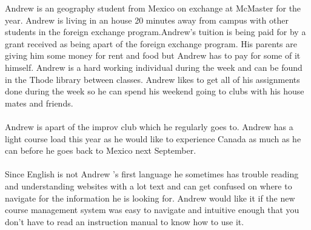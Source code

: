 \documentclass[12pt]{article}
\begin{document}
Andrew is an geography student from Mexico on exchange at McMaster for the year. Andrew is living in an house 20 minutes away from campus with other students in the foreign exchange program.Andrew's tuition is being paid for by a grant received as being apart of the foreign exchange program. His parents are giving him some money for rent and food but Andrew has to pay for some of it himself. Andrew is a hard working individual during the week and can be found in the Thode library between classes. Andrew likes to get all of his assignments done during the week so he can spend his weekend going to clubs with his house mates and friends.\\ \\
Andrew is apart of the improv club which he regularly goes to. Andrew has a light course load this year as he would like to experience Canada as much as he can before he goes back to Mexico next September.\\ \\
Since English is not Andrew 's first language he sometimes has trouble reading and understanding websites with a lot text and can get confused on where to navigate for the information he is looking for. Andrew would like it if the new course management system was easy to navigate and intuitive enough that you don't have to read an instruction manual to know how to use it.

\newpage


\end{document}
